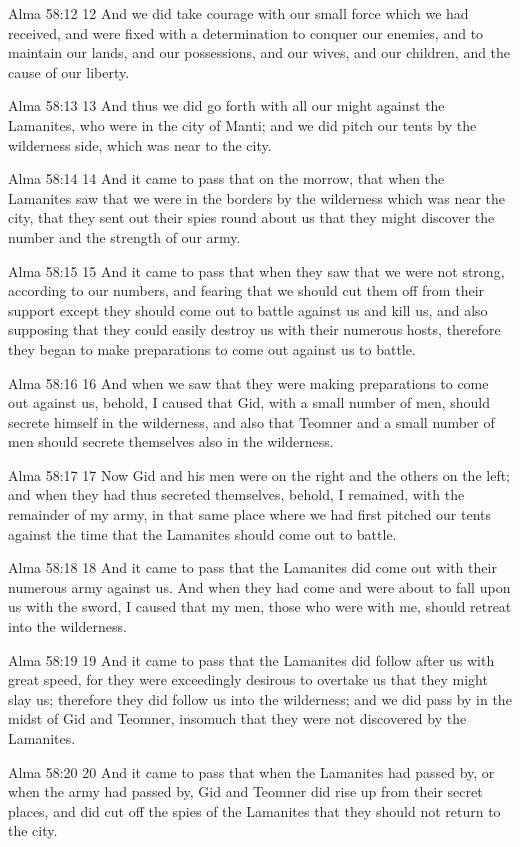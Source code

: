 Alma 58:12
 12 And we did take courage with our small force which we had
received, and were fixed with a determination to conquer our
enemies, and to maintain our lands, and our possessions, and our
wives, and our children, and the cause of our liberty.

Alma 58:13
 13 And thus we did go forth with all our might against the
Lamanites, who were in the city of Manti; and we did pitch our
tents by the wilderness side, which was near to the city.

Alma 58:14
 14 And it came to pass that on the morrow, that when the
Lamanites saw that we were in the borders by the wilderness which
was near the city, that they sent out their spies round about us
that they might discover the number and the strength of our army.

Alma 58:15
 15 And it came to pass that when they saw that we were not
strong, according to our numbers, and fearing that we should cut
them off from their support except they should come out to battle
against us and kill us, and also supposing that they could easily
destroy us with their numerous hosts, therefore they began to
make preparations to come out against us to battle.

Alma 58:16
 16 And when we saw that they were making preparations to come
out against us, behold, I caused that Gid, with a small number of
men, should secrete himself in the wilderness, and also that
Teomner and a small number of men should secrete themselves also
in the wilderness.

Alma 58:17
 17 Now Gid and his men were on the right and the others on the
left; and when they had thus secreted themselves, behold, I
remained, with the remainder of my army, in that same place where
we had first pitched our tents against the time that the
Lamanites should come out to battle.

Alma 58:18
 18 And it came to pass that the Lamanites did come out with
their numerous army against us. And when they had come and were
about to fall upon us with the sword, I caused that my men, those
who were with me, should retreat into the wilderness.

Alma 58:19
 19 And it came to pass that the Lamanites did follow after us
with great speed, for they were exceedingly desirous to overtake
us that they might slay us; therefore they did follow us into the
wilderness; and we did pass by in the midst of Gid and Teomner,
insomuch that they were not discovered by the Lamanites.

Alma 58:20
 20 And it came to pass that when the Lamanites had passed by, or
when the army had passed by, Gid and Teomner did rise up from
their secret places, and did cut off the spies of the Lamanites
that they should not return to the city.

